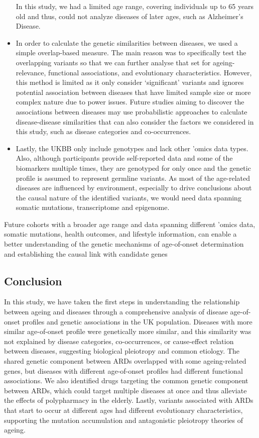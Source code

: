 \documentclass[12pt,twoside]{unicam}
\begin{document}
\begin{itemize}
  In this study, we had a limited age range, covering individuals up to 65 years old and thus, could not analyze diseases of later ages, such as Alzheimer's Disease.
\item
  In order to calculate the genetic similarities between diseases, we used a simple overlap-based measure. The main reason was to specifically test the overlapping variants so that we can further analyse that set for ageing-relevance, functional associations, and evolutionary characteristics. However, this method is limited as it only consider `significant' variants and ignores potential association between diseases that have limited sample size or more complex nature due to power issues. Future studies aiming to discover the associations between diseases may use probabilistic approaches to calculate disease-disease similarities that can also consider the factors we considered in this study, such as disease categories and co-occurrences.
\item
  Lastly, the UKBB only include genotypes and lack other 'omics data types. Also, although participants provide self-reported data and some of the biomarkers multiple times, they are genotyped for only once and the genetic profile is assumed to represent germline variants. As most of the age-related diseases are influenced by environment, especially to drive conclusions about the causal nature of the identified variants, we would need data spanning somatic mutations, transcriptome and epigenome.
\end{itemize}

Future cohorts with a broader age range and data spanning different 'omics data, somatic mutations, health outcomes, and lifestyle information, can enable a better understanding of the genetic mechanisms of age-of-onset determination and establishing the causal link with candidate genes

\hypertarget{conclusion-1}{%
\subsection{Conclusion}\label{conclusion-1}}

In this study, we have taken the first steps in understanding the relationship between ageing and diseases through a comprehensive analysis of disease age-of-onset profiles and genetic associations in the UK population. Diseases with more similar age-of-onset profile were genetically more similar, and this similarity was not explained by disease categories, co-occurrences, or cause-effect relation between diseases, suggesting biological pleiotropy and common etiology. The shared genetic component between ARDs overlapped with some ageing-related genes, but diseases with different age-of-onset profiles had different functional associations. We also identified drugs targeting the common genetic component between ARDs, which could target multiple diseases at once and thus alleviate the effects of polypharmacy in the elderly. Lastly, variants associated with ARDs that start to occur at different ages had different evolutionary characteristics, supporting the mutation accumulation and antagonistic pleiotropy theories of ageing.
\end{document}
